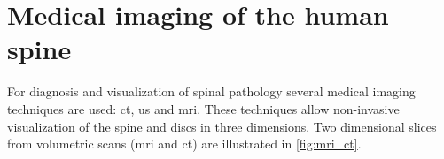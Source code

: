 \section{Medical imaging of the human spine\label{sec:medical_imaging}}
\par{
    For diagnosis and visualization of spinal pathology several medical imaging techniques are used: \acrfull{ct}, \acrfull{us} and \acrfull{mri}. 
    These techniques allow non-invasive visualization of the spine and discs in three dimensions.
    Two dimensional slices from volumetric scans (\acrshort{mri} and \acrshort{ct}) are illustrated in \ref{fig:mri_ct}.
}

